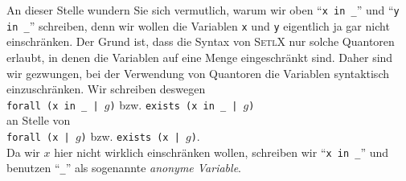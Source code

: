 \remark
 An dieser Stelle wundern Sie sich vermutlich, warum wir oben 
``\texttt{x in \_}'' und ``\texttt{y in \_}'' schreiben, denn wir wollen die Variablen
\texttt{x} und \texttt{y} eigentlich ja gar nicht einschr\"{a}nken.  Der Grund ist, dass die
Syntax von \textsc{SetlX} nur solche Quantoren erlaubt, in denen die Variablen auf eine
Menge eingeschr\"{a}nkt sind.  Daher sind wir gezwungen, bei der Verwendung von Quantoren die
Variablen syntaktisch einzuschr\"{a}nken.  Wir schreiben deswegen 
\\[0.2cm]
\hspace*{1.3cm}
\texttt{forall (x in \_ | $g$)} \quad bzw. \quad
\texttt{exists (x in \_ | $g$)} 
\\[0.2cm]
an Stelle von 
\\[0.2cm]
\hspace*{1.3cm}
\texttt{forall (x | $g$)} \quad bzw. \quad
\texttt{exists (x | $g$)}. 
\\[0.2cm]
Da wir $x$ hier nicht wirklich einschr\"{a}nken wollen, schreiben wir ``\texttt{x in \_}'' und benutzen
``\texttt{\_}'' als sogenannte \emph{anonyme Variable}.
\eox


